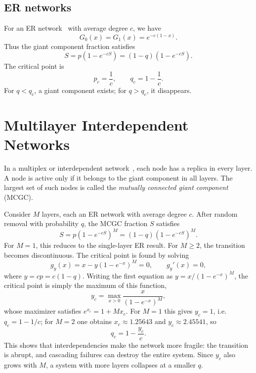 \documentclass[11pt]{article}
\begin{document}
\subsection{ER networks}
For an ER network~\cite{erdos1960} with average degree $c$, we have
\begin{equation}
  G_0(x)=G_1(x)=e^{-c(1-x)}.
\end{equation}
Thus the giant component fraction satisfies
\begin{equation}
  S = p(1-e^{-cS}) = (1-q)(1-e^{-cS}).
\end{equation}
The critical point is
\begin{equation}
  p_c = \frac{1}{c},\qquad q_c = 1-\frac{1}{c}.
\end{equation}
For $q<q_c$, a giant component exists; for $q>q_c$, it disappears.

\section{Multilayer Interdependent Networks}
In a multiplex or interdependent network~\cite{buldyrev2010}, each node has a replica in every layer. A node is active only if it belongs to the giant component in all layers. The largest set of such nodes is called the \emph{mutually connected giant component} (MCGC).

Consider $M$ layers, each an ER network with average degree $c$. After random removal with probability $q$, the MCGC fraction $S$ satisfies
\begin{equation}
  S = p(1-e^{-cS})^M = (1-q)(1-e^{-cS})^M.
\end{equation}
For $M=1$, this reduces to the single-layer ER result. For $M\ge 2$, the transition becomes discontinuous. The critical point is found by solving
\begin{equation}
  g_y(x)=x-y(1-e^{-x})^M=0,
  \qquad
  g_y'(x)=0,
\end{equation}
where $y=cp=c(1-q)$. Writing the first equation as $y=x/(1-e^{-x})^M$, the critical point is simply the maximum of this function,
\begin{equation}
  y_c = \max_{x>0} \frac{x}{(1-e^{-x})^M},
\end{equation}
whose maximizer satisfies $e^{x_c}=1+Mx_c$. For $M=1$ this gives $y_c=1$, i.e.\ $q_c=1-1/c$; for $M=2$ one obtains $x_c\approx 1.25643$ and $y_c\approx 2.45541$, so
\begin{equation}
  q_c = 1-\frac{y_c}{c}.
\end{equation}
This shows that interdependencies make the network more fragile: the transition is abrupt, and cascading failures can destroy the entire system. Since $y_c$ also grows with $M$, a system with more layers collapses at a smaller $q$.
\end{document}
